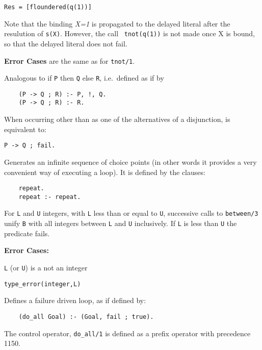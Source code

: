 \begin{description}
\begin{verbatim}
Res = [floundered(q(1))]
\end{verbatim}
Note that the binding {\em X=1} is propagated to the delayed literal
after the resulution of {\tt s(X)}.  However, the call {\tt
  tnot(q(1))} is not made once X is bound, so that the delayed literal
does not fail.

{\bf Error Cases} are the same as for {\tt tnot/1}.


    Analogous to if {\tt P} then {\tt Q} else {\tt R}, i.e.\ defined as 
    if by
	\begin{center}
	\begin{minipage}{2.10in}
	\begin{verbatim}
	(P -> Q ; R) :- P, !, Q.
	(P -> Q ; R) :- R.
	\end{verbatim}
	\end{minipage}
	\end{center}

 
    When occurring other than as one of the alternatives of a disjunction,
    is equivalent to:
	\begin{center}
	{\tt P -> Q ; fail.}
	\end{center}

    Generates an infinite sequence of choice points (in other words it 
    provides a very convenient way of executing a loop). It is defined 
    by the clauses:
    \begin{center}
    \begin{minipage}{1.5in}
    \begin{verbatim}
	repeat.
	repeat :- repeat.
    \end{verbatim}
    \end{minipage}
    \end{center}

%
For {\tt L} and {\tt U} integers, with {\tt L} less than or equal to
{\tt U}, successive calls to {\tt between/3} unify {\tt B} with all
integers between {\tt L} and {\tt U} inclusively.  If {\tt L} is less
than {\tt U} the predicate fails.

{\bf Error Cases:}
\bi
\item 	{\tt L} (or {\tt U}) is a not an integer
\bi
\item 	{\tt type\_error(integer,L)}
\ei
\ei

Defines a failure driven loop, as if defined by:
	\begin{center}
	\begin{minipage}{2.10in}
	\begin{verbatim}
	(do_all Goal) :- (Goal, fail ; true).
	\end{verbatim}
	\end{minipage}
	\end{center}
The control operator, {\tt do\_all/1} is defined as a prefix operator
with precedence 1150.


\end{description}
